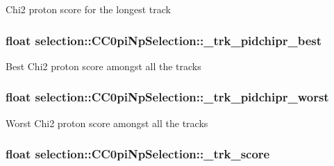 Chi2 proton score for the longest track \hypertarget{classselection_1_1CC0piNpSelection_aaf0a2841494bc52da55d267bc3c8db3d}{
\subsubsection[{\-\_\-trk\-\_\-pidchipr\-\_\-best}]{\setlength{\rightskip}{0pt plus 5cm}float selection\-::\-C\-C0pi\-Np\-Selection\-::\-\_\-trk\-\_\-pidchipr\-\_\-best\hspace{0.3cm}{\ttfamily [private]}}}\label{classselection_1_1CC0piNpSelection_aaf0a2841494bc52da55d267bc3c8db3d}
Best Chi2 proton score amongst all the tracks \hypertarget{classselection_1_1CC0piNpSelection_a6c06ff43f89cbee19cf466b830a6fe38}{
\subsubsection[{\-\_\-trk\-\_\-pidchipr\-\_\-worst}]{\setlength{\rightskip}{0pt plus 5cm}float selection\-::\-C\-C0pi\-Np\-Selection\-::\-\_\-trk\-\_\-pidchipr\-\_\-worst\hspace{0.3cm}{\ttfamily [private]}}}\label{classselection_1_1CC0piNpSelection_a6c06ff43f89cbee19cf466b830a6fe38}
Worst Chi2 proton score amongst all the tracks \hypertarget{classselection_1_1CC0piNpSelection_a72517a224dc19f95faef3efde9a999d1}{
\subsubsection[{\-\_\-trk\-\_\-score}]{\setlength{\rightskip}{0pt plus 5cm}float selection\-::\-C\-C0pi\-Np\-Selection\-::\-\_\-trk\-\_\-score\hspace{0.3cm}{\ttfamily [private]}}}\label{classselection_1_1CC0piNpSelection_a72517a224dc19f95faef3efde9a999d1}
